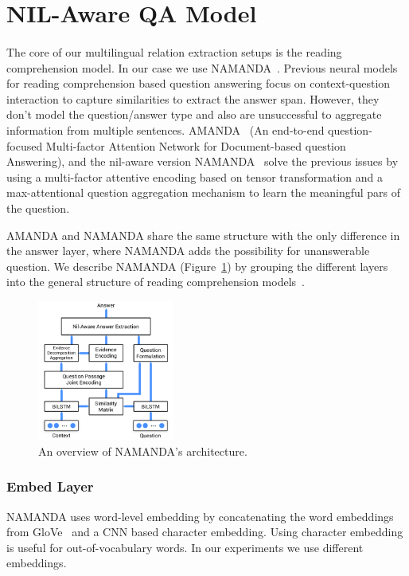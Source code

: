 \section{NIL-Aware QA Model}
\label{sec:namanda}
\paragraph{}
The core of our multilingual relation extraction setups is the reading comprehension model. In our case we use NAMANDA~\citep{kundu2018namanda}. Previous neural models for reading comprehension based question answering \citep{seo2016bidirectional, yang2017words} focus on context-question interaction to capture similarities to extract the answer span. However, they don't model the question/answer type and also are unsuccessful to aggregate information from multiple sentences. AMANDA~\citep{kundu2018amanda} (An end-to-end question-focused Multi-factor Attention Network for Document-based question Answering), and the nil-aware version NAMANDA~\citep{kundu2018namanda} solve the previous issues by using a multi-factor attentive encoding based on tensor transformation and a max-attentional question aggregation mechanism to learn the meaningful pars of the question. 

AMANDA and NAMANDA share the same structure with the only difference in the answer layer, where NAMANDA adds the possibility for unanswerable question. We describe NAMANDA (Figure~\ref{fig:namanda}) by grouping the different layers into the general structure of reading comprehension models~\citep{qiu2019survey}.  

\begin{figure}[h]
\centering
\includegraphics[width=0.4\textwidth]{images/namanda.pdf}
\caption{An overview of NAMANDA's architecture.}
\label{fig:namanda}
\end{figure}


\subsubsection{Embed Layer}
NAMANDA uses word-level embedding by concatenating the word embeddings from GloVe~\citep{pennington2014glove} and a CNN based character embedding. Using character embedding is useful for out-of-vocabulary words. In our experiments we use different embeddings.

